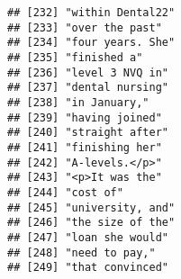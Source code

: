 \documentclass[]{article}
\begin{document}
\begin{verbatim}
## [232] "within Dental22"                                                                                                                          
## [233] "over the past"                                                                                                                            
## [234] "four years. She"                                                                                                                          
## [235] "finished a"                                                                                                                               
## [236] "level 3 NVQ in"                                                                                                                           
## [237] "dental nursing"                                                                                                                           
## [238] "in January,"                                                                                                                              
## [239] "having joined"                                                                                                                            
## [240] "straight after"                                                                                                                           
## [241] "finishing her"                                                                                                                            
## [242] "A-levels.</p>"                                                                                                                            
## [243] "<p>It was the"                                                                                                                            
## [244] "cost of"                                                                                                                                  
## [245] "university, and"                                                                                                                          
## [246] "the size of the"                                                                                                                          
## [247] "loan she would"                                                                                                                           
## [248] "need to pay,"                                                                                                                             
## [249] "that convinced"                                                                                                                           

\end{verbatim}
\end{document}
